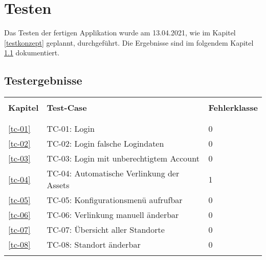 \chapter{Testen}
Das Testen der fertigen Applikation wurde am 13.04.2021, wie im Kapitel \ref{testkonzept} geplannt, durchgeführt. Die Ergebnisse sind im folgendem Kapitel \ref{test-ergebnisse} dokumentiert.
\section{Testergebnisse} \label{test-ergebnisse}
\begin{table}[H]
  \begin{tabularx}{\textwidth}{l X l}\hline \\
  \textbf{Kapitel} & \textbf{Test-Case} & \textbf{Fehlerklasse} \\ \\\hline \\
    \ref{tc-01} & TC-01: Login & 0 \\
    \ref{tc-02} & TC-02: Login falsche Logindaten & 0 \\
    \ref{tc-03} & TC-03: Login mit unberechtigtem Account & 0 \\
    \ref{tc-04} & TC-04: Automatische Verlinkung der Assets & 1 \\
    \ref{tc-05} & TC-05: Konfigurationsmenü aufrufbar & 0 \\
    \ref{tc-06} & TC-06: Verlinkung manuell änderbar & 0 \\
    \ref{tc-07} & TC-07: Übersicht aller Standorte & 0 \\
    \ref{tc-08} & TC-08: Standort änderbar & 0 \\
  \\\hline
  \end{tabularx}
\end{table}